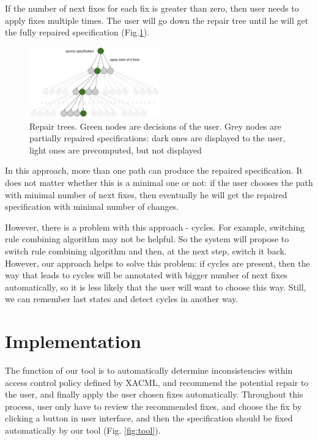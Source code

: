 \documentclass[letterpaper]{acm_proc_article-sp}
\begin{document}
If the number of next fixes for each fix is greater than zero, then user needs to apply fixes multiple times. The user will go down the repair tree until he will get the fully repaired specification (Fig.\ref{fig:tree}).

\begin{figure}[h]
\includegraphics[width=0.5\textwidth]{tree.png}
\caption{Repair trees. Green nodes are decisions of the user. Grey nodes are partially repaired specifications: dark ones are displayed to the user, light ones are precomputed, but not displayed}    
  \label{fig:tree}
\end{figure}

In this approach, more than one path can produce the repaired specification. It does not matter whether this is a minimal one or not: if the user chooses the path with minimal number of next fixes, then eventually he will get the repaired specification with minimal number of changes.

However, there is a problem with this approach - cycles. For example, switching rule combining algorithm may not be helpful. So the system will propose to switch rule combining algorithm and then, at the next step, switch it back. However, our approach helps to solve this problem: if cycles are present, then the way that leads to cycles will be annotated with bigger number of next fixes automatically, so it is less likely that the user will want to choose this way. Still, we can remember last states and detect cycles in another way.

\section{Implementation}
The function of our tool is to automatically determine inconsistencies within access control policy defined by XACML, and recommend the potential repair to the user, and finally apply the user chosen fixes automatically. Throughout this process, user only have to review the recommended fixes, and choose the fix by clicking a button in user interface, and then the specification should be fixed automatically by our tool (Fig. \ref{fig:tool}). 
\end{document}
